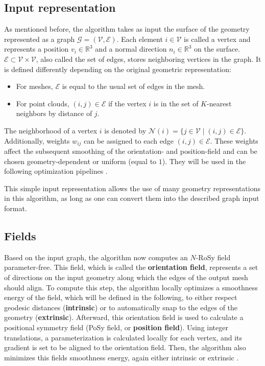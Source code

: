 \documentclass{ACGSeminar}
\begin{document}
\subsection{Input representation}
As mentioned before, the algorithm takes as input the surface of the geometry represented as a graph $\mathcal{G} = (\mathcal{V}, \mathcal{E})$. Each element $i \in \mathcal{V}$ is called a vertex and represents a position $v_i \in \mathbb{R}^3$ and a normal direction $n_i \in \mathbb{R}^3$ on the surface. $\mathcal{E} \subset \mathcal{V} \times \mathcal{V}$, also called the set of edges, stores neighboring vertices in the graph. It is defined differently depending on the original geometric representation:
\begin{itemize}
	\item	For meshes, $\mathcal{E}$ is equal to the usual set of edges in the mesh.
	\item	For point clouds, $(i,j) \in \mathcal{E}$ if the vertex $i$ is in the set of $K$-nearest neighbors by distance of $j$.
\end{itemize}
The neighborhood of a vertex $i$ is denoted by $\mathcal{N}(i) = \{j \in \mathcal{V} \mid (i,j) \in \mathcal{E}\}$. Additionally, weights $w_{ij}$ can be assigned to each edge $(i,j) \in \mathcal{E}$. These weights affect the subsequent smoothing of the orientation- and position-field and can be chosen geometry-dependent or uniform (equal to $1$). They will be used in the following optimization pipelines \cite{jakob2015instant}.\bigskip

This simple input representation allows the use of many geometry representations in this algorithm, as long as one can convert them into the described graph input format.

\subsection{Fields}
Based on the input graph, the algorithm now computes an $N$-RoSy field parameter-free. This field, which is called the \textbf{orientation field}, represents a set of directions on the input geometry along which the edges of the output mesh should align. To compute this step, the algorithm locally optimizes a smoothness energy of the field, which will be defined in the following, to either respect geodesic distances (\textbf{intrinsic}) or to automatically snap to the edges of the geometry (\textbf{extrinsic}). Afterward, this orientation field is used to calculate a positional symmetry field (PoSy field, or \textbf{position field}). Using integer translations, a parameterization is calculated locally for each vertex, and its gradient is set to be aligned to the orientation field. Then, the algorithm also minimizes this fields smoothness energy, again either intrinsic or extrinsic \cite{jakob2015instant}.\bigskip
\end{document}
